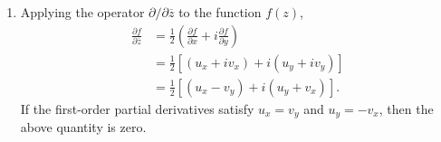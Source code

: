 \documentclass[a4paper,12pt]{article}
\begin{document}
\begin{enumerate}
\begin{enumerate}
            \item
                Applying the operator $\partial / \partial \overline{z}$ to the function $f(z)$,
                \begin{align*}
                    \frac{\partial f}{\partial \overline{z}} &= \frac{1}{2} \left( \frac{\partial f}{\partial x} + i\frac{\partial f}{\partial y} \right) \\
                    &= \frac{1}{2} \left[ (u_x + iv_x) + i(u_y + iv_y) \right] \\
                    &= \frac{1}{2} \left[ (u_x - v_y) + i(u_y + v_x) \right].
                \end{align*}
                If the first-order partial derivatives satisfy $u_x = v_y$ and $u_y = -v_x$, then the above quantity is zero.
        \end{enumerate}
\end{enumerate}
\end{document}
